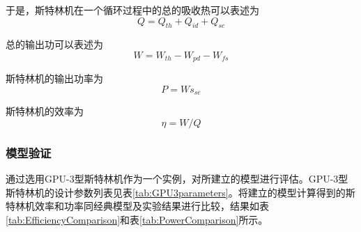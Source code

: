 于是，斯特林机在一个循环过程中的总的吸收热可以表述为
\begin{equation}
	Q = Q_{th} + Q_{id} + Q_{sc}
\end{equation}

总的输出功可以表述为
\begin{equation}
	W = W_{th} - W_{pd} - W_{fs}
\end{equation}

斯特林机的输出功率为
\begin{equation}
	P = Ws_{se}
	\label{Eq:P}
\end{equation}

斯特林机的效率为
\begin{equation}
	\eta = W/Q
	\label{Eq:eta}
\end{equation}


\subsubsection{模型验证}
\label{sec:modelValidation}

通过选用GPU-3型斯特林机作为一个实例，对所建立的模型进行评估。GPU-3型斯特林机的设计参数列表见表\ref{tab:GPU3parameters}。将建立的模型计算得到的斯特林机效率和功率同经典模型及实验结果进行比较，结果如表\ref{tab:EfficiencyComparison}和表\ref{tab:PowerComparison}所示。


